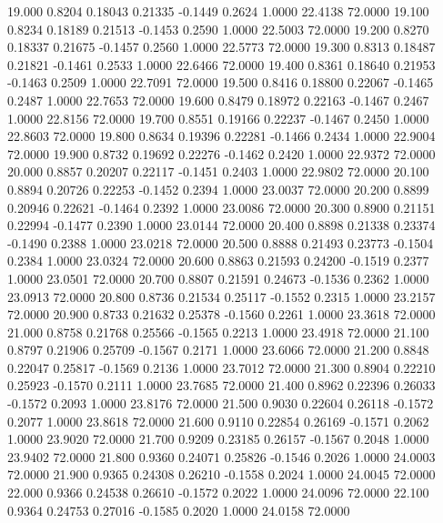   19.000   0.8204   0.18043   0.21335  -0.1449   0.2624   1.0000  22.4138  72.0000
  19.100   0.8234   0.18189   0.21513  -0.1453   0.2590   1.0000  22.5003  72.0000
  19.200   0.8270   0.18337   0.21675  -0.1457   0.2560   1.0000  22.5773  72.0000
  19.300   0.8313   0.18487   0.21821  -0.1461   0.2533   1.0000  22.6466  72.0000
  19.400   0.8361   0.18640   0.21953  -0.1463   0.2509   1.0000  22.7091  72.0000
  19.500   0.8416   0.18800   0.22067  -0.1465   0.2487   1.0000  22.7653  72.0000
  19.600   0.8479   0.18972   0.22163  -0.1467   0.2467   1.0000  22.8156  72.0000
  19.700   0.8551   0.19166   0.22237  -0.1467   0.2450   1.0000  22.8603  72.0000
  19.800   0.8634   0.19396   0.22281  -0.1466   0.2434   1.0000  22.9004  72.0000
  19.900   0.8732   0.19692   0.22276  -0.1462   0.2420   1.0000  22.9372  72.0000
  20.000   0.8857   0.20207   0.22117  -0.1451   0.2403   1.0000  22.9802  72.0000
  20.100   0.8894   0.20726   0.22253  -0.1452   0.2394   1.0000  23.0037  72.0000
  20.200   0.8899   0.20946   0.22621  -0.1464   0.2392   1.0000  23.0086  72.0000
  20.300   0.8900   0.21151   0.22994  -0.1477   0.2390   1.0000  23.0144  72.0000
  20.400   0.8898   0.21338   0.23374  -0.1490   0.2388   1.0000  23.0218  72.0000
  20.500   0.8888   0.21493   0.23773  -0.1504   0.2384   1.0000  23.0324  72.0000
  20.600   0.8863   0.21593   0.24200  -0.1519   0.2377   1.0000  23.0501  72.0000
  20.700   0.8807   0.21591   0.24673  -0.1536   0.2362   1.0000  23.0913  72.0000
  20.800   0.8736   0.21534   0.25117  -0.1552   0.2315   1.0000  23.2157  72.0000
  20.900   0.8733   0.21632   0.25378  -0.1560   0.2261   1.0000  23.3618  72.0000
  21.000   0.8758   0.21768   0.25566  -0.1565   0.2213   1.0000  23.4918  72.0000
  21.100   0.8797   0.21906   0.25709  -0.1567   0.2171   1.0000  23.6066  72.0000
  21.200   0.8848   0.22047   0.25817  -0.1569   0.2136   1.0000  23.7012  72.0000
  21.300   0.8904   0.22210   0.25923  -0.1570   0.2111   1.0000  23.7685  72.0000
  21.400   0.8962   0.22396   0.26033  -0.1572   0.2093   1.0000  23.8176  72.0000
  21.500   0.9030   0.22604   0.26118  -0.1572   0.2077   1.0000  23.8618  72.0000
  21.600   0.9110   0.22854   0.26169  -0.1571   0.2062   1.0000  23.9020  72.0000
  21.700   0.9209   0.23185   0.26157  -0.1567   0.2048   1.0000  23.9402  72.0000
  21.800   0.9360   0.24071   0.25826  -0.1546   0.2026   1.0000  24.0003  72.0000
  21.900   0.9365   0.24308   0.26210  -0.1558   0.2024   1.0000  24.0045  72.0000
  22.000   0.9366   0.24538   0.26610  -0.1572   0.2022   1.0000  24.0096  72.0000
  22.100   0.9364   0.24753   0.27016  -0.1585   0.2020   1.0000  24.0158  72.0000
